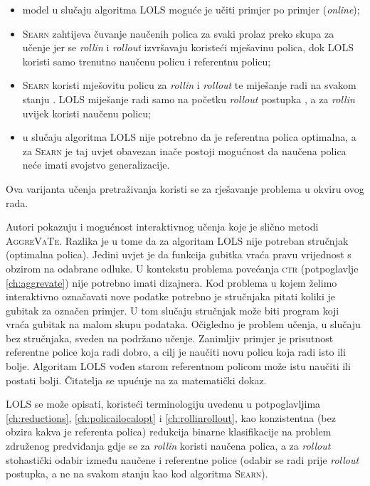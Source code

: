 \begin{itemize}
  \item model u slučaju algoritma \textsc{LOLS} moguće je učiti primjer po
  primjer (\textit{online});

  \item \textsc{Searn} zahtijeva čuvanje naučenih polica za svaki prolaz preko
  skupa za učenje jer se \emph{rollin} i \emph{rollout} izvršavaju koristeći
  mješavinu polica, dok \textsc{LOLS} koristi samo trenutno naučenu policu i
  referentnu policu;

  \item \textsc{Searn} koristi mješovitu policu za \emph{rollin} i
  \emph{rollout} te miješanje radi na svakom stanju .
  \textsc{LOLS} miješanje radi samo na početku \emph{rollout} postupka
  , a za \emph{rollin} uvijek koristi naučenu policu;

  \item u slučaju algoritma \textsc{LOLS} nije potrebno da je referentna polica
  optimalna, a za \textsc{Searn} je taj uvjet obavezan inače postoji mogućnost
  da naučena polica neće imati svojstvo generalizacije.

\end{itemize}

\noindent
Ova varijanta učenja pretraživanja koristi se za rješavanje problema u okviru
ovog rada.

Autori pokazuju i mogućnost interaktivnog učenja koje je slično metodi
\textsc{AggreVaTe}. Razlika je u tome da za algoritam \textsc{LOLS} nije
potreban stručnjak (optimalna polica). Jedini uvjet je da funkcija gubitka vraća
pravu vrijednost s obzirom na odabrane odluke. U kontekstu problema povećanja
\textsc{ctr} (potpoglavlje \ref{ch:aggrevate}) nije potrebno imati dizajnera.
Kod problema u kojem želimo interaktivno označavati nove podatke potrebno je
stručnjaka pitati koliki je gubitak za označen primjer. U tom slučaju stručnjak
može biti program koji vraća gubitak na malom skupu podataka. Očigledno je
problem učenja, u slučaju bez stručnjaka, sveden na podržano učenje. Zanimljiv
primjer je prisutnost referentne police koja radi dobro, a cilj je naučiti novu
policu koja radi isto ili bolje. Algoritam \textsc{LOLS} vođen starom
referentnom policom može istu naučiti ili postati bolji. Čitatelja se upućuje na
\cite{daume15lols} za matematički dokaz.

\textsc{LOLS} se može opisati, koristeći terminologiju uvedenu u potpoglavljima
\ref{ch:reductions}, \ref{ch:policailocalopt} i \ref{ch:rollinrollout}, kao
konzistentna (bez obzira kakva je referenta polica) redukcija binarne
klasifikacije na problem združenog predviđanja gdje se za \textit{rollin}
koristi naučena polica, a za \textit{rollout} stohastički odabir između naučene
i referentne police (odabir se radi prije \textit{rollout} postupka, a ne na
svakom stanju kao kod algoritma \textsc{Searn}).
